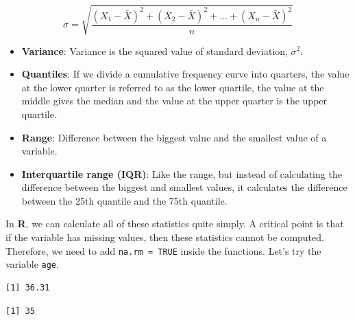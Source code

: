 \documentclass[]{book}
\newenvironment{Shaded}{\begin{snugshade}}{\end{snugshade}}
\newcommand{\CommentTok}[1]{\textcolor[rgb]{0.56,0.35,0.01}{\textit{#1}}}
\newcommand{\DataTypeTok}[1]{\textcolor[rgb]{0.13,0.29,0.53}{#1}}
\newcommand{\KeywordTok}[1]{\textcolor[rgb]{0.13,0.29,0.53}{\textbf{#1}}}
\newcommand{\NormalTok}[1]{#1}
\newcommand{\OperatorTok}[1]{\textcolor[rgb]{0.81,0.36,0.00}{\textbf{#1}}}
\newcommand{\OtherTok}[1]{\textcolor[rgb]{0.56,0.35,0.01}{#1}}
\begin{document}
\[\sigma = \sqrt{\frac{(X_1-\bar{X})^2+(X_2-\bar{X})^2+...+(X_n-\bar{X})^2}{n}}\]

\begin{itemize}
\item
  \textbf{Variance}: Variance is the squared value of standard deviation, \(\sigma^2\).
\item
  \textbf{Quantiles}: If we divide a cumulative frequency curve into quarters, the value at the lower quarter is referred to as the lower quartile, the value at the middle gives the median and the value at the upper quarter is the upper quartile.
\item
  \textbf{Range}: Difference between the biggest value and the smallest value of a variable.
\item
  \textbf{Interquartile range (IQR)}: Like the range, but instead of calculating the difference between the biggest and smallest values, it calculates the difference between the 25th quantile and the 75th quantile.
\end{itemize}

In \textbf{R}, we can calculate all of these statistics quite simply. A critical point is that if the variable has missing values, then these statistics cannot be computed. Therefore, we need to add \texttt{na.rm\ =\ TRUE} inside the functions. Let's try the variable \texttt{age}.

\begin{Shaded}
\end{Shaded}

\begin{verbatim}
[1] 36.31
\end{verbatim}

\begin{Shaded}
\end{Shaded}

\begin{verbatim}
[1] 35
\end{verbatim}

\begin{Shaded}
\end{Shaded}
\end{document}
